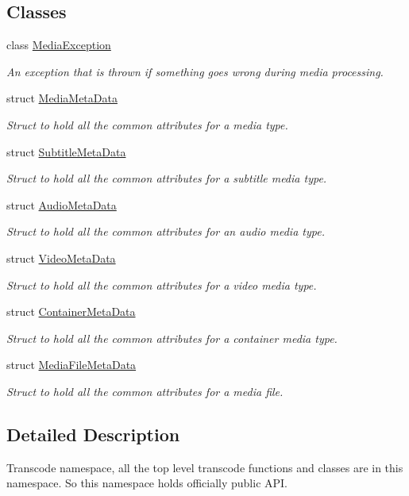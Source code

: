 \subsection*{Classes}
\begin{DoxyCompactItemize}
\item 
class \hyperlink{classtranscode_1_1MediaException}{MediaException}
\begin{DoxyCompactList}\small\item\em An exception that is thrown if something goes wrong during media processing. \item\end{DoxyCompactList}\item 
struct \hyperlink{structtranscode_1_1MediaMetaData}{MediaMetaData}
\begin{DoxyCompactList}\small\item\em Struct to hold all the common attributes for a media type. \item\end{DoxyCompactList}\item 
struct \hyperlink{structtranscode_1_1SubtitleMetaData}{SubtitleMetaData}
\begin{DoxyCompactList}\small\item\em Struct to hold all the common attributes for a subtitle media type. \item\end{DoxyCompactList}\item 
struct \hyperlink{structtranscode_1_1AudioMetaData}{AudioMetaData}
\begin{DoxyCompactList}\small\item\em Struct to hold all the common attributes for an audio media type. \item\end{DoxyCompactList}\item 
struct \hyperlink{structtranscode_1_1VideoMetaData}{VideoMetaData}
\begin{DoxyCompactList}\small\item\em Struct to hold all the common attributes for a video media type. \item\end{DoxyCompactList}\item 
struct \hyperlink{structtranscode_1_1ContainerMetaData}{ContainerMetaData}
\begin{DoxyCompactList}\small\item\em Struct to hold all the common attributes for a container media type. \item\end{DoxyCompactList}\item 
struct \hyperlink{structtranscode_1_1MediaFileMetaData}{MediaFileMetaData}
\begin{DoxyCompactList}\small\item\em Struct to hold all the common attributes for a media file. \item\end{DoxyCompactList}\end{DoxyCompactItemize}


\subsection{Detailed Description}
Transcode namespace, all the top level transcode functions and classes are in this namespace. So this namespace holds officially public API. 